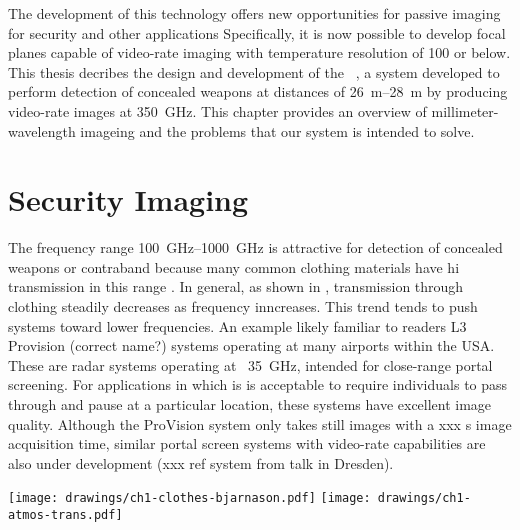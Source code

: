 The development of this technology offers new opportunities for passive imaging for security and other applications
Specifically, it is now possible to develop focal planes capable of video-rate imaging with temperature resolution of \SI{100}{\mK} or below.
This thesis decribes the design and development of the \NIST\ \Imager, a system developed to perform detection of concealed weapons at distances of \SIrange{26}{28}{\m} by producing video-rate images at \SI{350}{\GHz}.
This chapter provides an overview of millimeter-wavelength imageing and the problems that our system is intended to solve.

\section{Security Imaging}

The frequency range \SIrange{100}{1000}{\GHz} is attractive for detection of concealed weapons or contraband because many common clothing materials have hi transmission in this range \cite{bjarnason_millimeter-wave_2004}.
In general, as shown in , transmission through clothing steadily decreases as frequency inncreases.
This trend tends to push systems toward lower frequencies.
An example likely familiar to readers L3 Provision (correct name?) systems operating at many airports within the USA.
These are radar systems operating at ~\SI{35}{\GHz}, intended for close-range portal screening.
For applications in which is is acceptable to require individuals to pass through and pause at a particular location, these systems have excellent image quality.
Although the ProVision system only takes still images with a xxx s image acquisition time, similar portal screen systems with video-rate capabilities are also under development (xxx ref system from talk in Dresden).

\begin{figure*}
\centering
\texttt{[image: drawings/ch1-clothes-bjarnason.pdf]}
\texttt{[image: drawings/ch1-atmos-trans.pdf]}
\caption[Clothing and Atmospheric Transmission vs Frequency]{
  \textbf{Left}
  Plot of clothing transmission vs frequency.
  Taken from \cite{bjarnason_millimeter-wave_2004}.
  As frequency increases, transmission through all kinds of clothing decreases.
  The \SI{-10}{\dB} observation band of the \Imager\ is highlighted (\SIrange{318}{376}{\GHz}).
  \textbf{right}
  Plot showing a model of zenith atmospheric transmission on the summit of Mauna Kea, assuming \SI{0.5}{\mm} of percipital water vapor.
  The plot is illustrative only, demonstrating the presence of atmospheric transmission windows and the general trend of worse transmission at higher frequencies.
  The data was obtained using the Caltech Submillimeter Observatory (CSO) Atmospheric Transmission Interactive Plotter \cite{darek_lis_cso_????}, which is based on a published model \cite{pardo_atmospheric_2001}.
}
\label{fig:ch1-clothes-atmos-trans}
\end{figure*}

